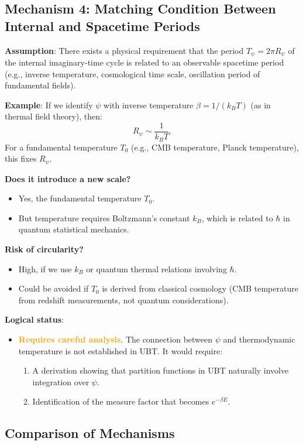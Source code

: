 \documentclass[12pt]{article}
\begin{document}
\subsection{Mechanism 4: Matching Condition Between Internal and Spacetime Periods}

\textbf{Assumption}: There exists a physical requirement that the period $T_\psi = 2\pi R_\psi$ of the internal imaginary-time cycle is related to an observable spacetime period (e.g., inverse temperature, cosmological time scale, oscillation period of fundamental fields).

\textbf{Example}: If we identify $\psi$ with inverse temperature $\beta = 1/(k_B T)$ (as in thermal field theory), then:
\[
R_\psi \sim \frac{1}{k_B T}.
\]
For a fundamental temperature $T_0$ (e.g., CMB temperature, Planck temperature), this fixes $R_\psi$.

\textbf{Does it introduce a new scale?}
\begin{itemize}
\item Yes, the fundamental temperature $T_0$.
\item But temperature requires Boltzmann's constant $k_B$, which is related to $\hbar$ in quantum statistical mechanics.
\end{itemize}

\textbf{Risk of circularity?}
\begin{itemize}
\item High, if we use $k_B$ or quantum thermal relations involving $\hbar$.
\item Could be avoided if $T_0$ is derived from classical cosmology (CMB temperature from redshift measurements, not quantum considerations).
\end{itemize}

\textbf{Logical status}:
\begin{itemize}
\item \textcolor{orange}{\textbf{Requires careful analysis}}. The connection between $\psi$ and thermodynamic temperature is not established in UBT. It would require:
\begin{enumerate}
\item A derivation showing that partition functions in UBT naturally involve integration over $\psi$.
\item Identification of the measure factor that becomes $e^{-\beta E}$.
\end{enumerate}
\end{itemize}

\subsection{Comparison of Mechanisms}
\end{document}
